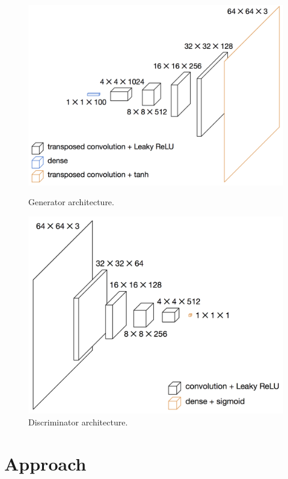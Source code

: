 \documentclass[11pt,twocolumn,letterpaper]{article}
\begin{document}
\begin{figure}[ht]
  \centering
    \begin{minipage}{.495\linewidth}
    \centering
        \includegraphics[width=\linewidth]{imgs/generator.png}
        \caption{Generator architecture.}
        \label{fig:gen}
    \end{minipage}
    \quad
    \begin{minipage}{.45\linewidth}
        \centering
        \includegraphics[width=\linewidth]{imgs/discriminator.png}
        \caption{Discriminator architecture.}
        \label{fig:discrim}
    \end{minipage}
\end{figure}

\section{Approach}
\end{document}
